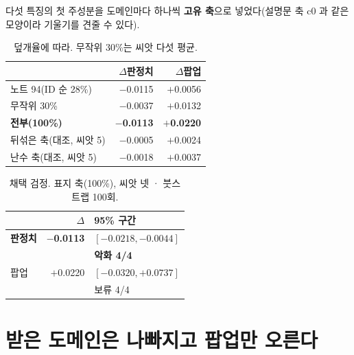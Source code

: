 \documentclass[10pt]{article}
\begin{document}
다섯 특징의 첫 주성분을 도메인마다 하나씩 \textbf{고유 축}으로 넣었다(설명문
축 c0 과 같은 모양이라 기울기를 견줄 수 있다).

\begin{table}[t]
\centering\tsize
\caption{덮개율에 따라. 무작위 30\%는 씨앗 다섯 평균.}
\begin{tabular}{lrr}
\toprule
& $\Delta$판정치 & $\Delta$팝업 \\
\midrule
노트 94(ID 순 28\%) & $-$0.0115 & $+$0.0056 \\
무작위 30\% & $-$0.0037 & $+$0.0132 \\
\textbf{전부(100\%)} & \textbf{$-$0.0113} & \textbf{$+$0.0220} \\
\midrule
뒤섞은 축(대조, 씨앗 5) & $-$0.0005 & $+$0.0024 \\
난수 축(대조, 씨앗 5) & $-$0.0018 & $+$0.0037 \\
\bottomrule
\end{tabular}
\end{table}

\begin{table}[t]
\centering\tsize
\caption{채택 검정. 표지 축(100\%), 씨앗 넷 · 붓스트랩 100회.}
\begin{tabular}{lrl}
\toprule
& $\Delta$ & 95\% 구간 \\
\midrule
\textbf{판정치} & \textbf{$-$0.0113} & $[-0.0218, -0.0044]$ \\
& & \textbf{악화 4/4} \\
팝업 & $+$0.0220 & $[-0.0320, +0.0737]$ \\
& & 보류 4/4 \\
\bottomrule
\end{tabular}
\end{table}


\section{받은 도메인은 나빠지고 팝업만 오른다}
\end{document}
